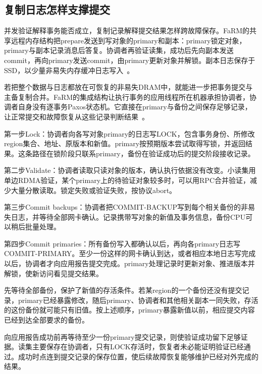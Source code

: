 \subsection{复制日志怎样支撑提交}

并发验证解释事务能否成立，复制记录解释提交结果怎样跨故障保存。FaRM的共享远程内存结构把prepare发送到写对象的primary和副本：primary锁定对象，primary与副本记录消息后答复。协调者再验证读集，成功后先向副本发送commit，再向primary发送commit，由primary更新对象并解锁。副本日志保存于SSD，以少量非易失内存缓冲日志写入~\cite{farm2014}。


若把整个数据与日志都放在可恢复的非易失DRAM中，就能进一步把事务提交与主备复制合并。FaRM的集成结构让执行事务的应用线程所在机器承担协调者，协调者自身没有逐事务Paxos状态机。它直接在primary与备份之间保存足够记录，让正常提交和故障恢复从这些记录判断结果~\cite{farm2015}。

第一步Lock：协调者向各写对象primary的日志写LOCK，包含事务身份、所修改region集合、地址、原版本和新值。primary按预期版本尝试取得写锁，并返回结果。这条路径在锁阶段只联系primary，备份在验证成功后的提交阶段接收记录。

第二步Validate：协调者读取只读对象的版本，确认执行依据没有改变。小读集用单边RDMA验证，某个primary上的待验证对象较多时，可以用RPC合并验证，减少大量分散读取。锁定失败或验证失败，按协议abort。

第三步Commit backups：协调者把COMMIT-BACKUP写到每个相关备份的非易失日志，并等待全部网卡确认。记录携带写对象的新值及事务信息，备份CPU可以稍后批量处理。

第四步Commit primaries：所有备份写入都确认以后，再向各primary日志写COMMIT-PRIMARY。至少一份这样的网卡确认到达，或者相应本地日志写完成以后，协调者才向应用报告提交完成。primary处理记录时更新对象、推进版本并解锁，使新访问看见提交结果。


先等待全部备份，保护了新值的存活条件。若某region的一个备份还没有提交记录，primary已经暴露修改，随后primary、协调者和其他相关副本一同失败，存活的这份备份就可能只有旧值。按上述顺序，primary暴露新值以前，相应提交内容已经到达全部要求的备份。

向应用报告成功前再等待至少一份primary提交记录，则使验证成功留下足够证据。读集主要保存在协调者，只有LOCK存活时，恢复者未必能证明验证已经通过。成功时点连到提交记录的保存位置，使后续故障恢复能够维护已经对外完成的结果。

